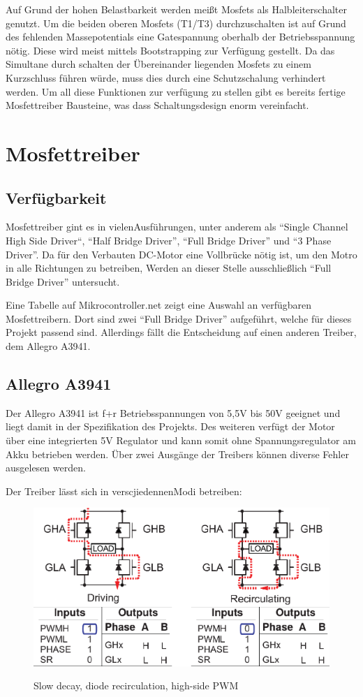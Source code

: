 Auf Grund der hohen Belastbarkeit werden meißt Mosfets als Halbleiterschalter genutzt. Um die beiden oberen Mosfets (T1/T3) durchzuschalten
ist auf Grund des fehlenden Massepotentials eine Gatespannung oberhalb der Betriebsspannung nötig. Diese wird meist mittels Bootstrapping zur
Verfügung gestellt. Da das Simultane durch schalten der Übereinander liegenden Mosfets zu einem Kurzschluss führen würde, muss dies durch
eine Schutzschalung verhindert werden. Um all diese Funktionen zur verfügung zu stellen gibt es bereits fertige Mosfettreiber Bausteine,
was dass Schaltungsdesign enorm vereinfacht.

\section{Mosfettreiber}
\subsection{Verfügbarkeit}

Mosfettreiber gint es in vielenAusführungen, unter anderem als ``Single Channel High Side Driver``, ``Half Bridge Driver'', ``Full Bridge Driver''
und ``3 Phase Driver''. Da für den Verbauten DC-Motor eine Vollbrücke nötig ist, um den Motro in alle Richtungen zu betreiben, Werden an dieser Stelle
ausschließlich ``Full Bridge Driver'' untersucht.

Eine Tabelle auf Mikrocontroller.net\cite{FET_D_TABLE} zeigt eine Auswahl an verfügbaren Mosfettreibern. Dort sind zwei
``Full Bridge Driver'' aufgeführt, welche für dieses Projekt passend sind. Allerdings fällt die Entscheidung auf einen anderen Treiber,
dem Allegro A3941.
\subsection{Allegro A3941}
Der Allegro A3941 ist f+r Betriebsspannungen von 5,5V bis 50V geeignet und liegt damit in der Spezifikation des Projekts.
Des weiteren verfügt der Motor über eine integrierten 5V Regulator und kann somit ohne Spannungsregulator am Akku betrieben werden.
Über zwei Ausgänge der Treibers können diverse Fehler ausgelesen werden.


Der Treiber lässt sich in verscjiedennenModi betreiben:

\begin{figure}[H]
\centering
\includegraphics[width=.8\textwidth]{3941_1.png}\\
\caption{Slow decay, diode recirculation, high-side PWM}%
\label{fig:3941_1}
\end{figure}

